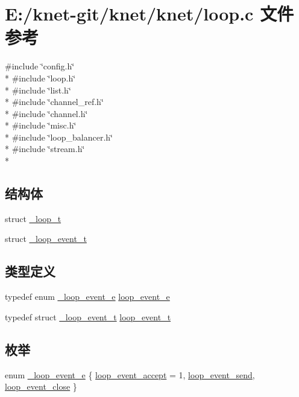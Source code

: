 \hypertarget{a00052}{}\section{E\+:/knet-\/git/knet/knet/loop.c 文件参考}
\label{a00052}
{\ttfamily \#include \char`\"{}config.\+h\char`\"{}}\\*
{\ttfamily \#include \char`\"{}loop.\+h\char`\"{}}\\*
{\ttfamily \#include \char`\"{}list.\+h\char`\"{}}\\*
{\ttfamily \#include \char`\"{}channel\+\_\+ref.\+h\char`\"{}}\\*
{\ttfamily \#include \char`\"{}channel.\+h\char`\"{}}\\*
{\ttfamily \#include \char`\"{}misc.\+h\char`\"{}}\\*
{\ttfamily \#include \char`\"{}loop\+\_\+balancer.\+h\char`\"{}}\\*
{\ttfamily \#include \char`\"{}stream.\+h\char`\"{}}\\*
\subsection*{结构体}
\begin{DoxyCompactItemize}
\item 
struct \hyperlink{a00025}{\+\_\+loop\+\_\+t}
\item 
struct \hyperlink{a00023}{\+\_\+loop\+\_\+event\+\_\+t}
\end{DoxyCompactItemize}
\subsection*{类型定义}
\begin{DoxyCompactItemize}
\item 
typedef enum \hyperlink{a00052_a19ff97cc6f736cb864d4e4b6ca60989d_a19ff97cc6f736cb864d4e4b6ca60989d}{\+\_\+loop\+\_\+event\+\_\+e} \hyperlink{a00052_ab92fe4e788615cfd56530167651a8ff4_ab92fe4e788615cfd56530167651a8ff4}{loop\+\_\+event\+\_\+e}
\item 
typedef struct \hyperlink{a00023}{\+\_\+loop\+\_\+event\+\_\+t} \hyperlink{a00052_a1095ee772017ce29dcac0987c456709e_a1095ee772017ce29dcac0987c456709e}{loop\+\_\+event\+\_\+t}
\end{DoxyCompactItemize}
\subsection*{枚举}
\begin{DoxyCompactItemize}
\item 
enum \hyperlink{a00052_a19ff97cc6f736cb864d4e4b6ca60989d_a19ff97cc6f736cb864d4e4b6ca60989d}{\+\_\+loop\+\_\+event\+\_\+e} \{ \hyperlink{a00052_a19ff97cc6f736cb864d4e4b6ca60989d_a19ff97cc6f736cb864d4e4b6ca60989da93a9ab540948567abea69a6e0b11dc34}{loop\+\_\+event\+\_\+accept} = 1, 
\hyperlink{a00052_a19ff97cc6f736cb864d4e4b6ca60989d_a19ff97cc6f736cb864d4e4b6ca60989da77ae92c7311b87c9e301782962e8d0bf}{loop\+\_\+event\+\_\+send}, 
\hyperlink{a00052_a19ff97cc6f736cb864d4e4b6ca60989d_a19ff97cc6f736cb864d4e4b6ca60989da93d334afa1678d196564d70b138c7150}{loop\+\_\+event\+\_\+close}
 \}
\end{DoxyCompactItemize}
